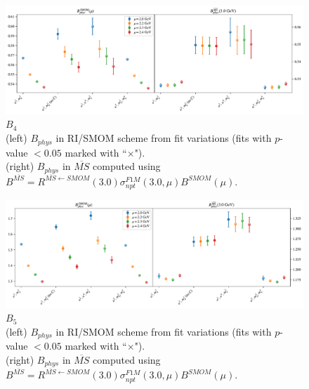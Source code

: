 \documentclass[12pt]{extarticle}
\begin{document}
\clearpage
\begin{figure}
\centering
\includegraphics[page=1, width=1.1\textwidth]{SSpPP/NPR/fit_summary.pdf}
\caption{$B_{4}$\\(left) $B_{phys}$ in RI/SMOM scheme from fit variations (fits with $p$-value $<0.05$ marked with ``$\times$"). \\(right) $B_{phys}$ in $\overline{MS}$ computed using $B^{\overline{MS}} = R^{\overline{MS}\leftarrow SMOM}(3.0)\sigma_{npt}^{F1M}(3.0,\mu) B^{SMOM}(\mu)$.}
\end{figure}
\clearpage
\begin{figure}
\centering
\includegraphics[page=1, width=1.1\textwidth]{TT/NPR/fit_summary.pdf}
\caption{$B_{5}$\\(left) $B_{phys}$ in RI/SMOM scheme from fit variations (fits with $p$-value $<0.05$ marked with ``$\times$"). \\(right) $B_{phys}$ in $\overline{MS}$ computed using $B^{\overline{MS}} = R^{\overline{MS}\leftarrow SMOM}(3.0)\sigma_{npt}^{F1M}(3.0,\mu) B^{SMOM}(\mu)$.}
\end{figure}
\clearpage
\end{document}
